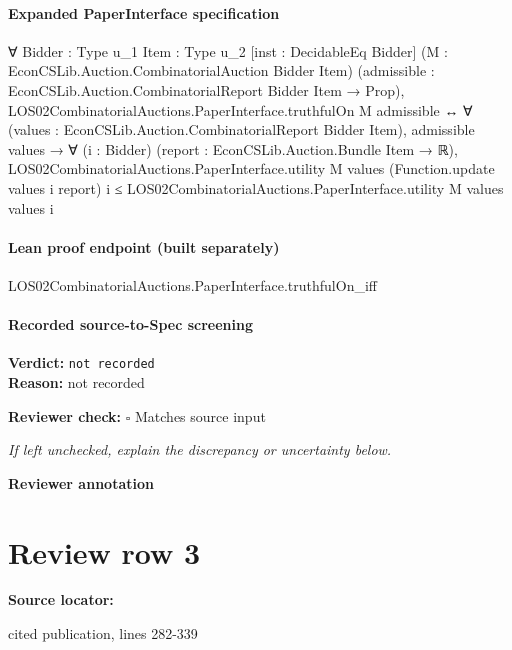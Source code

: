\documentclass[10pt]{article}
\newcommand{\reviewerbox}{%
  \par\noindent\fbox{\parbox{0.96\linewidth}{\rule{0pt}{0.38in}}}\par
}
\newcommand{\reviewmatch}[1]{%
  \par\noindent\textbf{Reviewer check:} $\square$\; #1\par
  \noindent\emph{If left unchecked, explain the discrepancy or uncertainty below.}\par
}
\begin{document}
\paragraph{Expanded PaperInterface specification}
\begin{ReviewVerbatim}
∀ {Bidder : Type u_1} {Item : Type u_2} [inst : DecidableEq Bidder]
  (M : EconCSLib.Auction.CombinatorialAuction Bidder Item)
  (admissible : EconCSLib.Auction.CombinatorialReport Bidder Item → Prop),
  LOS02CombinatorialAuctions.PaperInterface.truthfulOn M admissible ↔
    ∀ (values : EconCSLib.Auction.CombinatorialReport Bidder Item),
      admissible values →
        ∀ (i : Bidder) (report : EconCSLib.Auction.Bundle Item → ℝ),
          LOS02CombinatorialAuctions.PaperInterface.utility M values (Function.update values i report) i ≤
            LOS02CombinatorialAuctions.PaperInterface.utility M values values i
\end{ReviewVerbatim}

\paragraph{Lean proof endpoint (built separately)}\begin{ReviewVerbatim}
LOS02CombinatorialAuctions.PaperInterface.truthfulOn_iff
\end{ReviewVerbatim}

\paragraph{Recorded source-to-Spec screening}
\textbf{Verdict:} \texttt{not recorded}
\\
\textbf{Reason:} not recorded
\reviewmatch{Matches source input}
\noindent\textbf{Reviewer annotation}\par
\reviewerbox
\clearpage
\hypertarget{source-claim-c6037488ca244560}{}
\section*{Review row 3}
\textbf{Source locator:} {\footnotesize\raggedright cited publication, lines 282-\allowbreak{}339\par}
\end{document}
